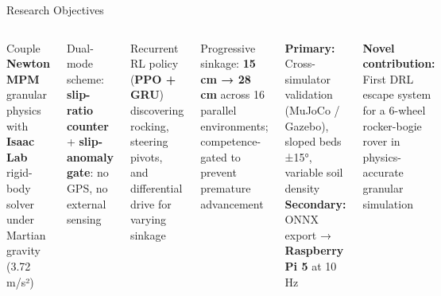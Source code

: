 \documentclass[aspectratio=169, 10pt]{beamer}
\newcommand{\keyword}[1]{\textbf{\color{MarsLight}#1}}
\newcommand{\teal}[1]{{\color{ArcticTeal}#1}}
\newcommand{\tick}{\textcolor{AccentGreen}{\faCheckCircle}}
\begin{document}
\begin{frame}{Research Objectives}
\vspace{0.2em}
\begin{columns}[T]

\begin{tcolorbox}[mycard, title={\faFlask\; Obj 1: Realistic Simulation}]
  \scriptsize
  Couple \keyword{Newton MPM} granular physics with \keyword{Isaac Lab}
  rigid-body solver under \teal{Martian gravity (3.72 m/s²)}
\end{tcolorbox}
\vspace{0.25em}

\begin{tcolorbox}[mycard, title={\faRadiation\; Obj 2: Entrapment Detection}]
  \scriptsize
  Dual-mode scheme: \keyword{slip-ratio counter} +
  \keyword{slip-anomaly gate}: no GPS, no external sensing
\end{tcolorbox}
\vspace{0.25em}

\begin{tcolorbox}[mycard, title={\faBrain\; Obj 3: Recovery Policy}]
  \scriptsize
  Recurrent RL policy (\keyword{PPO + GRU}) discovering rocking,
  steering pivots, and differential drive for varying sinkage
\end{tcolorbox}


\begin{tcolorbox}[mycard, title={\faGraduationCap\; Obj 4: Curriculum Learning}]
  \scriptsize
  Progressive sinkage: \keyword{15 cm → 28 cm} across 16 parallel
  environments; competence-gated to prevent premature advancement
\end{tcolorbox}
\vspace{0.25em}

\begin{tcolorbox}[mycard, title={\faSyncAlt\; Obj 5: Sim-to-Sim \& Sim-to-Real}]
  \scriptsize
  \textbf{Primary:} Cross-simulator validation (MuJoCo / Gazebo),
  sloped beds ±15°, variable soil density\\[3pt]
  \textbf{Secondary:} ONNX export → \keyword{Raspberry Pi 5} at 10 Hz
\end{tcolorbox}
\vspace{0.25em}

\begin{tcolorbox}[greenbox]
  \scriptsize\centering
  \tick\; \textbf{Novel contribution:} First DRL escape system for a
  6-wheel rocker-bogie rover in physics-accurate granular simulation
\end{tcolorbox}

\end{columns}
\end{frame}
\end{document}
